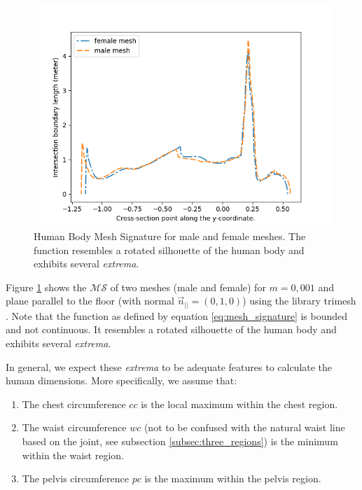 \documentclass[runningheads, orivec]{llncs}
\begin{document}
\begin{figure}[t]
	\begin{center}
		\includegraphics[width=\linewidth]{mesh_signature.png}
	\end{center}
	\caption{Human Body Mesh Signature for male and female meshes. The 
		function resembles a rotated silhouette of the human body and exhibits 
		several \textit{extrema}.}
	\label{fig:hbm_signature}
\end{figure}

Figure \ref{fig:hbm_signature} shows the $\mathcal{MS}$ of two meshes (male 
and female) for 
$m=0,001$ and plane parallel to the floor (with normal 
$\vec{n}_{||} = (0, 
1,0)$) using the library trimesh \cite{trimesh}. Note that the function as 
defined by equation \ref{eq:mesh_signature} is bounded and not continuous. It 
resembles a rotated silhouette of the human body and exhibits several 
\textit{extrema}.

In general, we expect these \textit{extrema} to be adequate features to 
calculate the human dimensions. More specifically, we assume that:
\begin{enumerate}
	\item The chest circumference $cc$ is the local maximum within the chest 
	region.
	\item The waist circumference $wc$ (not to be confused with the natural 
	waist line based on the joint, see subsection \ref{subsec:three_regions}) 
	is the minimum within the waist region.	
	\item The pelvis circumference $pc$ is the maximum within the pelvis region.
\end{enumerate}
\end{document}
